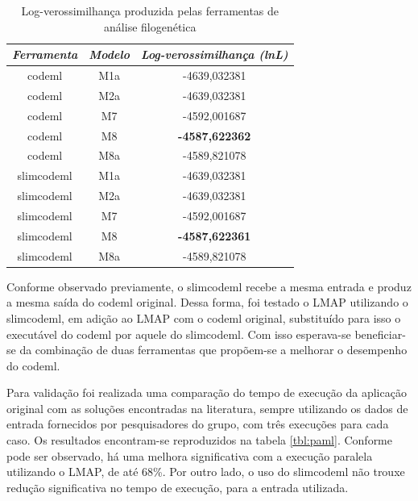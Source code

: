 \documentclass[cic,tc]{iiufrgs}
\begin{document}
\begin{table}[h]
    \caption{Log-verossimilhança produzida pelas ferramentas de análise filogenética}
    \centering
        \begin{tabular}{c|c|c}
          \hline
          \textit{Ferramenta}  &   \textit{Modelo} & \textit{Log-verossimilhança (lnL)} \\
          \hline
          \hline
          codeml            & M1a & -4639,032381 \\
          codeml            & M2a & -4639,032381 \\
          codeml            & M7  & -4592,001687 \\
          codeml            & M8  & \textbf{-4587,622362} \\
          codeml            & M8a & -4589,821078 \\
          slimcodeml        & M1a & -4639,032381 \\
          slimcodeml        & M2a & -4639,032381 \\
          slimcodeml        & M7  & -4592,001687 \\
          slimcodeml        & M8  & \textbf{-4587,622361} \\
          slimcodeml        & M8a & -4589,821078 \\
          \hline
        \end{tabular}
    \label{tbl:log}
\end{table}

Conforme observado previamente, o slimcodeml recebe a mesma entrada e produz a
mesma saída do codeml original. Dessa forma, foi testado o LMAP utilizando o
slimcodeml, em adição ao LMAP com o codeml original, substituído para isso o
executável do codeml por aquele do slimcodeml. Com isso esperava-se
beneficiar-se da combinação de duas ferramentas que propõem-se a melhorar o
desempenho do codeml. 

Para validação foi realizada uma comparação do tempo de execução da aplicação
original com as soluções encontradas na literatura, sempre utilizando os dados
de entrada fornecidos por pesquisadores do grupo, com três execuções para cada
caso. Os resultados encontram-se reproduzidos na tabela \ref{tbl:paml}.
Conforme pode ser observado, há uma melhora significativa com a execução
paralela utilizando o LMAP, de até 68\%. Por outro lado, o uso do slimcodeml
não trouxe redução significativa no tempo de execução, para a entrada
utilizada.
\end{document}
